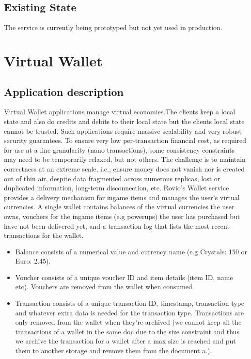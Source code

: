 \documentclass[11pt,a4paper]{report}
\begin{document}
\subsection{Existing State}
The service is currently being prototyped but not yet used in production.

\section{Virtual Wallet}
\subsection{Application description}
Virtual Wallet applications manage virtual economies.The clients keep a local state and also do credits and debits to their local state but the clients local state cannot be trusted.  Such applications require massive scalability and very robust security guarantees. To ensure very low per-­transaction ﬁnancial cost, as required for use at a ﬁne granularity (nano-­transactions), some consistency constraints may need to be temporarily relaxed, but not others. The challenge is to maintain correctness at an extreme scale, i.e., ensure money does not vanish nor is created out of thin air, despite data fragmented across numerous replicas, lost or duplicated information, long­-term disconnection, etc.
Rovio's Wallet service provides a delivery mechanism for in­game items and manages the user's virtual currencies. A single wallet contains balances of the virtual currencies the user owns, vouchers for the in­game items (e.g power­ups) the user has purchased but have not been delivered yet, and a transaction log that lists the most recent transactions for the wallet.

\begin{itemize}
\item Balance consists of a numerical value and currency name (e.g Crystals: 150 or Euro: 2.45).
\item Voucher consists of a unique voucher ID and item details (item ID, name etc). Vouchers are removed from the wallet when consumed.
\item Transaction consists of a unique transaction ID, timestamp, transaction type and whatever extra data is needed for the transaction type. Transactions are only removed from the wallet when they're archived (we cannot keep all the transactions of a wallet in the same doc due to the size constraint and thus we archive the transaction for a wallet after a max size is reached and put them to another storage and remove them from the document a.).
\end{itemize}
\end{document}
